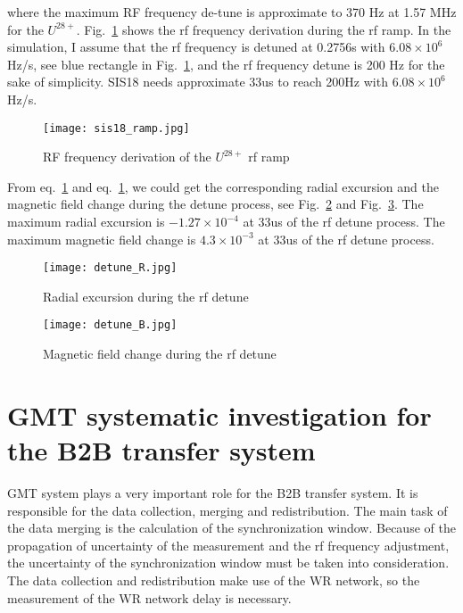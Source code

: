 where the maximum RF frequency de-tune is approximate to 370 Hz at 1.57 MHz for the $U^{ 28+}$. Fig.~\ref{sis18_ramp} shows the rf frequency derivation during the rf ramp. In the simulation, I assume that the rf frequency is detuned at 0.2756s with $6.08 \times 10^{6}$Hz/s, see blue rectangle in Fig.~\ref{sis18_ramp}, and the rf frequency detune is 200 Hz for the sake of simplicity. SIS18 needs approximate 33us to reach 200Hz with  $6.08 \times 10^{6}$Hz/s.
\begin{figure}[!htb]
   \centering   
   \texttt{[image: sis18\_ramp.jpg]}
   \caption{RF frequency derivation of the $U^{28+}$ rf ramp}
   \label{sis18_ramp}
\end{figure}


From eq.~\ref{} and eq.~\ref{}, we could get the corresponding radial excursion and the magnetic field change during the detune process, see Fig.~\ref{detune_R} and Fig.~\ref{detune_B}. The maximum radial excursion is $-1.27 \times 10^{-4}$ at 33us of the rf detune process. The maximum magnetic field change is $4.3 \times 10^{-3}$ at 33us of the rf detune process.
\begin{figure}[!htb]
   \centering   
   \texttt{[image: detune\_R.jpg]}
   \caption{Radial excursion during the rf detune}
   \label{detune_R}
\end{figure}
\begin{figure}[!htb]
   \centering   
   \texttt{[image: detune\_B.jpg]}
   \caption{Magnetic field change during the rf detune}
   \label{detune_B}
\end{figure}
 
\section{GMT systematic investigation for the B2B transfer system}
GMT system plays a very important role for the B2B transfer system. It is responsible for the data collection, merging and redistribution. The main task of the data merging is the calculation of the synchronization window. Because of the propagation of uncertainty of the measurement and the rf frequency adjustment, the uncertainty of the synchronization window must be taken into consideration. The data collection and redistribution make use of the WR network, so the measurement of the WR network delay   is necessary. 

